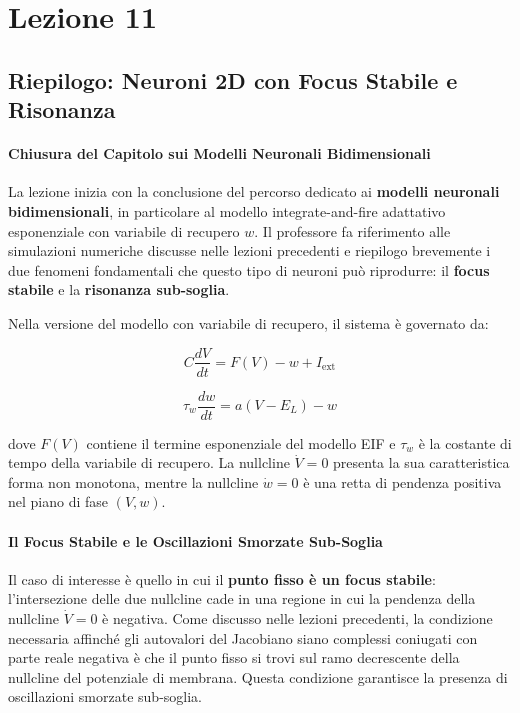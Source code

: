 \chapter{Lezione 11}


\section{Riepilogo: Neuroni 2D con Focus Stabile e Risonanza}

\subsubsection{Chiusura del Capitolo sui Modelli Neuronali Bidimensionali}

La lezione inizia con la conclusione del percorso dedicato ai \textbf{modelli neuronali bidimensionali}, in particolare al modello integrate-and-fire adattativo esponenziale con variabile di recupero $w$. Il professore fa riferimento alle simulazioni numeriche discusse nelle lezioni precedenti e riepilogo brevemente i due fenomeni fondamentali che questo tipo di neuroni può riprodurre: il \textbf{focus stabile} e la \textbf{risonanza sub-soglia}.

Nella versione del modello con variabile di recupero, il sistema è governato da:

\begin{equation}
C \frac{dV}{dt} = F(V) - w + I_{\text{ext}}
\end{equation}

\begin{equation}
\tau_w \frac{dw}{dt} = a(V - E_L) - w
\end{equation}

dove $F(V)$ contiene il termine esponenziale del modello EIF e $\tau_w$ è la costante di tempo della variabile di recupero. La nullcline $\dot{V} = 0$ presenta la sua caratteristica forma non monotona, mentre la nullcline $\dot{w} = 0$ è una retta di pendenza positiva nel piano di fase $(V, w)$.

\subsubsection{Il Focus Stabile e le Oscillazioni Smorzate Sub-Soglia}

Il caso di interesse è quello in cui il \textbf{punto fisso è un focus stabile}: l'intersezione delle due nullcline cade in una regione in cui la pendenza della nullcline $\dot{V} = 0$ è negativa. Come discusso nelle lezioni precedenti, la condizione necessaria affinché gli autovalori del Jacobiano siano complessi coniugati con parte reale negativa è che il punto fisso si trovi sul ramo decrescente della nullcline del potenziale di membrana. Questa condizione garantisce la presenza di oscillazioni smorzate sub-soglia.

